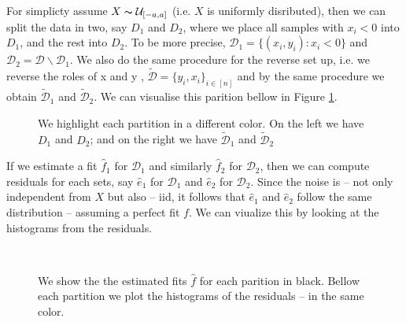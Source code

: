 For simplicty assume $X \thicksim \mathcal{U}_{[-a, a]}$ (i.e. $X$ is uniformly disributed), then we can split 
the data in two, say $D_1$ and $D_2$, where we place all samples with $x_i < 0$ into $D_1$, and the rest into 
$D_2$. To be more precise, $\mathcal{D}_1 = \{(x_i, y_i) : x_i < 0\}$ and $\mathcal{D}_2 = \mathcal{D} 
\backslash \mathcal{D}_1$. We also do the same procedure for the reverse set up, i.e. we reverse the roles of x and y
, $\mathcal{\tilde{D}} = \{y_i, x_i\}_{i \in [n]}$ and by the same procedure we obtain $\mathcal{\tilde{D}}_1$
and $\mathcal{\tilde{D}}_2$. We can visualise this parition bellow in Figure \ref{fig:colo_code}.
 
\begin{figure}[H]
    \captionsetup[subfigure]{labelformat=empty}
    \centering
    \caption{ We highlight each partition in a different color. On the left we have $D_1$ and $D_2$; and on 
    the right we have $\mathcal{\tilde{D}}_1$ and $\mathcal{\tilde{D}}_2$ }
    \label{fig:colo_code}
\end{figure}

If we estimate a fit $\hat{f}_1$ for $\mathcal{D}_1$ and similarly $\hat{f}_2$ for $\mathcal{D}_2$, then we can 
compute residuals for each sets, say $\hat{e}_1$ for $\mathcal{D}_1$  and $\hat{e}_2$ for $\mathcal{D}_2$.
Since the noise is -- not only independent from $X$ but also -- iid, it follows that $\hat{e}_1$ and $\hat{e}_2$
follow the same distribution -- assuming a perfect fit $f$. We can viualize this by looking at the 
histograms from the residuals.

\begin{figure}[H]
    \captionsetup[subfigure]{labelformat=empty}
    \centering
    \\


    \caption{  We show the the estimated fits $\hat{f}$ for each parition in black. Bellow each 
    partition we plot the histograms of the residuals -- in the same color. }
    \label{fig:algo_fit}
\end{figure}

